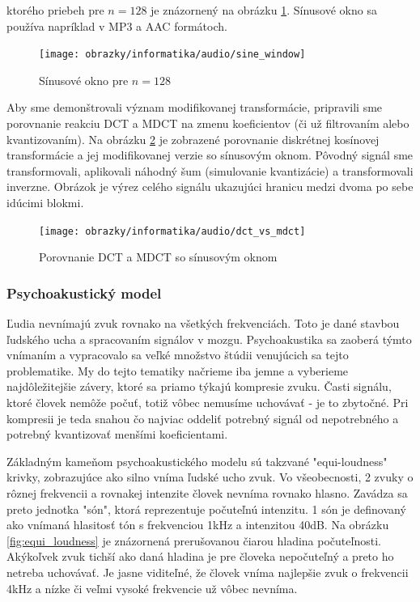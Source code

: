 ktorého priebeh pre $n=128$ je znázornený na obrázku
\ref{fig:sine_window}. Sínusové okno sa používa napríklad v MP3 a AAC
formátoch.

\begin{figure}[htp]
    \centering
    \texttt{[image: obrazky/informatika/audio/sine\_window]}
    \caption{Sínusové okno pre $n=128$}
    \label{fig:sine_window}
\end{figure}

Aby sme demonštrovali význam modifikovanej transformácie, pripravili
sme porovnanie reakciu DCT a MDCT na zmenu koeficientov (či už
filtrovaním alebo kvantizovaním).
Na obrázku \ref{fig:dct_vs_mdct} je zobrazené porovnanie diskrétnej
kosínovej transformácie a jej modifikovanej verzie so sínusovým oknom.
Pôvodný signál sme transformovali, aplikovali náhodný šum (simulovanie
kvantizácie) a transformovali inverzne. Obrázok je výrez celého
signálu ukazujúci hranicu medzi dvoma po sebe idúcimi blokmi.
\begin{figure}[htp]
    \centering
    \texttt{[image: obrazky/informatika/audio/dct\_vs\_mdct]}
    \caption{Porovnanie DCT a MDCT so sínusovým oknom}
    \label{fig:dct_vs_mdct}
\end{figure}

\subsubsection{Psychoakustický model}
Ľudia nevnímajú zvuk rovnako na všetkých frekvenciách. Toto je dané
stavbou ľudského ucha a spracovaním signálov v mozgu. Psychoakustika
sa zaoberá týmto vnímaním a vypracovalo sa veľké množstvo štúdii
venujúcich sa tejto problematike. My do tejto tematiky načrieme iba jemne
a vyberieme najdôležitejšie závery, ktoré sa priamo týkajú
kompresie zvuku. Časti signálu, ktoré človek nemôže počuť, totiž vôbec
nemusíme uchovávať - je to zbytočné. Pri kompresii je teda snahou čo
najviac oddeliť potrebný signál od nepotrebného a potrebný kvantizovať
menšími koeficientami.

Základným kameňom psychoakustického modelu sú takzvané "equi-loudness"
krivky, zobrazujúce ako silno vníma ľudské ucho zvuk. Vo všeobecnosti,
2 zvuky o rôznej frekvencii a rovnakej intenzite človek nevníma rovnako hlasno.
Zavádza sa preto jednotka "són", ktorá reprezentuje počuteľnú
intenzitu. 1 són je definovaný ako vnímaná hlasitosť tón s frekvenciou
1kHz a intenzitou 40dB. Na obrázku \ref{fig:equi_loudness} je
znázornená prerušovanou čiarou hladina počuteľnosti. Akýkoľvek zvuk
tichší ako daná hladina je pre človeka nepočuteľný a preto ho netreba
uchovávať. Je jasne viditeľné, že človek vníma najlepšie zvuk o
frekvencii 4kHz a nízke či veľmi vysoké frekvencie už vôbec nevníma.

